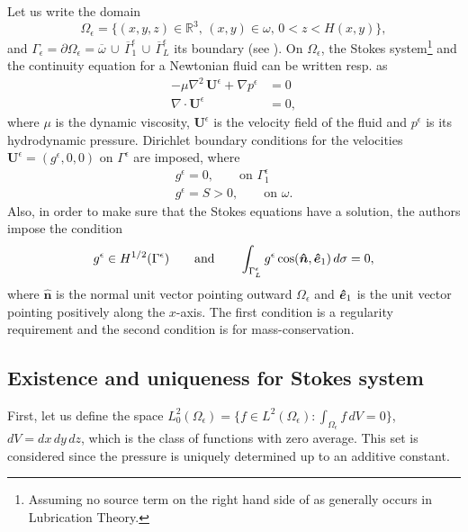 Let us write the domain $$\Omega_\epsilon=\{(x,y,z)\in \mathbb{R}^3,\,(x,y)\in \omega, \,0 < z<H(x,y)\},$$and $\Gamma_\epsilon=\partial \Omega_\epsilon=\overline{\omega}\,\cup\,\overline{\Gamma}_1^\epsilon\,\cup\,\overline{\Gamma}_L^\epsilon$ its boundary (see ). On $\Omega_\epsilon$, the Stokes system\footnote{Assuming no source term on the right hand side of  as generally occurs in Lubrication Theory.} and the continuity equation for a Newtonian fluid can be written resp. as
\begin{align}
-\mu\nabla ^2\, \mathbf{U}^\epsilon+\nabla p^\epsilon&= 0 \label{eq:stokes_system}\\
\nabla \cdot \mathbf{U}^\epsilon &=0,\label{eq:stokes_continuity}
\end{align}
where $\mu$ is the dynamic viscosity, $\mathbf{U}^\epsilon$ is the velocity field of the fluid and $p^\epsilon$ is its hydrodynamic pressure. Dirichlet boundary conditions for the velocities $\mathbf{U}^\epsilon=(g^\epsilon,0,0)$ on $\Gamma^\epsilon$ are imposed, where
\begin{align}
g^\epsilon=0,\qquad \text{on }\Gamma_1^\epsilon\label{eq:cond_rey_b1}\\
g^\epsilon=S>0,\qquad \text{on }\omega.\label{eq:cond_rey_b2}
\end{align}
Also, in order to make sure that the Stokes equations have a solution, the authors \cite{chambat1986} impose the condition
\begin{equation}
g^\epsilon \in H^{1/2}(\Gamma^\epsilon)\qquad \text{and}\qquad \int_{\Gamma^\epsilon_L} g^\epsilon \cos(\bds{\hat{n}},\bds{\hat{e}}_1)\, d\sigma =0,\label{eq:cond_rey_b3}
\end{equation}
where $\mathbf{\hat{n}}$ is the normal unit vector pointing outward $\Omega_\epsilon$ and $\boldsymbol{\hat{e}}_1$ is the unit vector pointing positively along the $x$-axis. The first condition is a regularity requirement and the second condition is for mass-conservation.
\subsection*{Existence and uniqueness for Stokes system}
First, let us define the space $L_0^2(\Omega_\epsilon)=\{f\in L^2(\Omega_\epsilon):\int_{\Omega_\epsilon} f\,dV=0\}$, $dV=dx\,dy\,dz$, which is the class of functions with zero average. This set is considered since the pressure is uniquely determined up to an additive constant.

